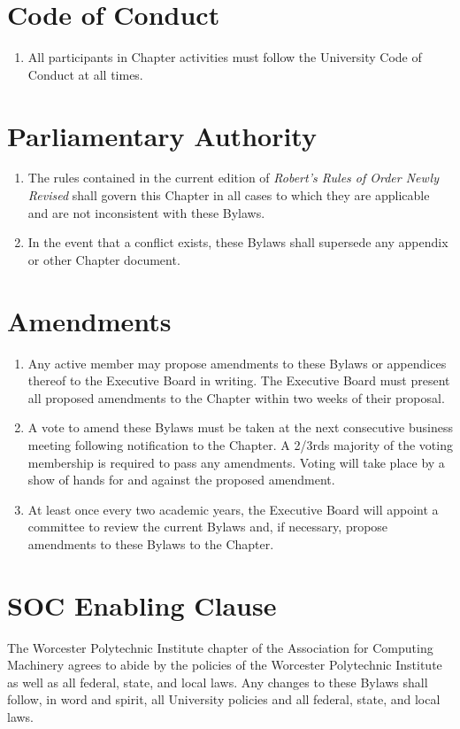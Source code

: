 \documentclass[12pt, letterpaper, oneside]{book}
\begin{document}
\chapter{Code of Conduct}
\begin{enumerate}
    \item All participants in Chapter activities must follow the University Code
        of Conduct at all times.
\end{enumerate}

\chapter{Parliamentary Authority}
\begin{enumerate}
    \item The rules contained in the current edition of \emph{Robert's Rules of
        Order Newly Revised} shall govern this Chapter in all cases to which
        they are applicable and are not inconsistent with these Bylaws.
    \item In the event that a conflict exists, these Bylaws shall supersede any
        appendix or other Chapter document.
\end{enumerate}

\chapter{Amendments}
\begin{enumerate}
    \item Any active member may propose amendments to these Bylaws or appendices
        thereof to the Executive Board in writing. The Executive Board must
        present all proposed amendments to the Chapter within two weeks of their
        proposal.
    \item A vote to amend these Bylaws must be taken at the next consecutive
        business meeting following notification to the Chapter.
        \subitem A 2/3rds majority of the voting membership is required to pass
        any amendments. Voting will take place by a show of hands for and
        against the proposed amendment.
    \item At least once every two academic years, the Executive Board will
        appoint a committee to review the current Bylaws and, if necessary,
        propose amendments to these Bylaws to the Chapter.
\end{enumerate}

\chapter{SOC Enabling Clause}
The Worcester Polytechnic Institute chapter of the Association for Computing
Machinery agrees to abide by the policies of the Worcester Polytechnic Institute
as well as all federal, state, and local laws. Any changes to these Bylaws shall
follow, in word and spirit, all University policies and all federal, state, and
local laws.
\end{document}

